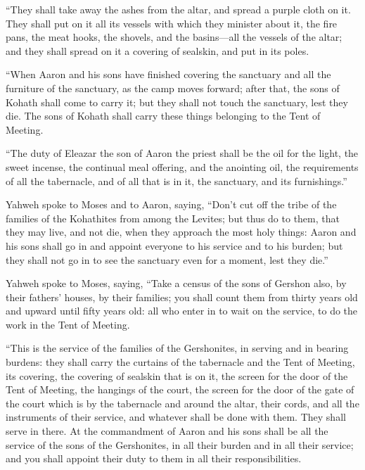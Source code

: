 {\par }{\PP {}“They shall take away the ashes from the altar, and spread a purple cloth on it.
They shall put on it all its vessels with which they minister about it, the fire pans, the meat hooks, the shovels, and the basins—all the vessels of the altar; and they shall spread on it a covering of sealskin, and put in its poles.
\par }{\PP {}“When Aaron and his sons have finished covering the sanctuary and all the furniture of the sanctuary, as the camp moves forward; after that, the sons of Kohath shall come to carry it; but they shall not touch the sanctuary, lest they die. The sons of Kohath shall carry these things belonging to the Tent of Meeting.
\par }{\PP {}“The duty of Eleazar the son of Aaron the priest shall be the oil for the light, the sweet incense, the continual meal offering, and the anointing oil, the requirements of all the tabernacle, and of all that is in it, the sanctuary, and its furnishings.”
\par }{\PP {}Yahweh spoke to Moses and to Aaron, saying,
“Don’t cut off the tribe of the families of the Kohathites from among the Levites;
but thus do to them, that they may live, and not die, when they approach the most holy things: Aaron and his sons shall go in and appoint everyone to his service and to his burden;
but they shall not go in to see the sanctuary even for a moment, lest they die.”
\par }{\PP {}Yahweh spoke to Moses, saying,
“Take a census of the sons of Gershon also, by their fathers’ houses, by their families;
you shall count them from thirty years old and upward until fifty years old: all who enter in to wait on the service, to do the work in the Tent of Meeting.
\par }{\PP {}“This is the service of the families of the Gershonites, in serving and in bearing burdens:
they shall carry the curtains of the tabernacle and the Tent of Meeting, its covering, the covering of sealskin that is on it, the screen for the door of the Tent of Meeting,
the hangings of the court, the screen for the door of the gate of the court which is by the tabernacle and around the altar, their cords, and all the instruments of their service, and whatever shall be done with them. They shall serve in there.
At the commandment of Aaron and his sons shall be all the service of the sons of the Gershonites, in all their burden and in all their service; and you shall appoint their duty to them in all their responsibilities.
}
